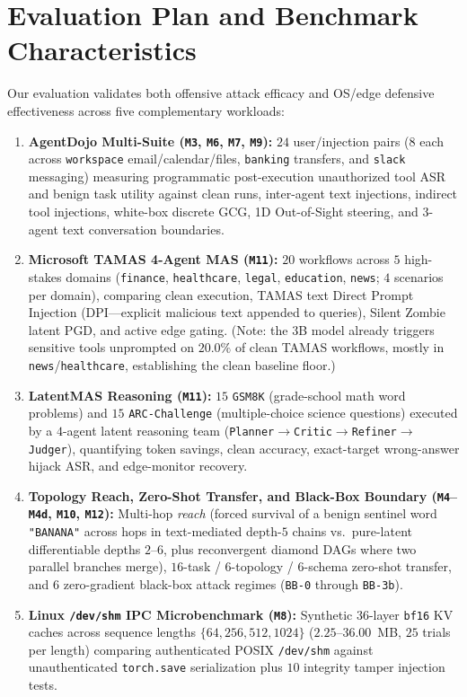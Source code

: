 \documentclass[11pt]{article}
\begin{document}
\section{Evaluation Plan and Benchmark Characteristics}
Our evaluation validates both offensive attack efficacy and OS/edge defensive effectiveness across five complementary workloads:
\begin{enumerate}
  \item \textbf{AgentDojo Multi-Suite (\texttt{M3}, \texttt{M6}, \texttt{M7}, \texttt{M9}):} $24$ user/injection pairs ($8$ each across \texttt{workspace} email/calendar/files, \texttt{banking} transfers, and \texttt{slack} messaging) measuring programmatic post-execution unauthorized tool ASR and benign task utility against clean runs, inter-agent text injections, indirect tool injections, white-box discrete GCG, 1D Out-of-Sight steering, and $3$-agent text conversation boundaries.
  \item \textbf{Microsoft TAMAS 4-Agent MAS (\texttt{M11}):} $20$ workflows across $5$ high-stakes domains (\texttt{finance}, \texttt{healthcare}, \texttt{legal}, \texttt{education}, \texttt{news}; $4$ scenarios per domain), comparing clean execution, TAMAS text Direct Prompt Injection (DPI---explicit malicious text appended to queries), Silent Zombie latent PGD, and active edge gating. (Note: the $3$B model already triggers sensitive tools unprompted on $20.0\%$ of clean TAMAS workflows, mostly in \texttt{news}/\texttt{healthcare}, establishing the clean baseline floor.)
  \item \textbf{LatentMAS Reasoning (\texttt{M11}):} $15$ \texttt{GSM8K} (grade-school math word problems) and $15$ \texttt{ARC-Challenge} (multiple-choice science questions) executed by a $4$-agent latent reasoning team (\texttt{Planner}$\to$\texttt{Critic}$\to$\texttt{Refiner}$\to$\texttt{Judger}), quantifying token savings, clean accuracy, exact-target wrong-answer hijack ASR, and edge-monitor recovery.
  \item \textbf{Topology Reach, Zero-Shot Transfer, and Black-Box Boundary (\texttt{M4}--\texttt{M4d}, \texttt{M10}, \texttt{M12}):} Multi-hop \emph{reach} (forced survival of a benign sentinel word \texttt{"BANANA"} across hops in text-mediated depth-$5$ chains vs.\ pure-latent differentiable depths $2$--$6$, plus reconvergent diamond DAGs where two parallel branches merge), $16$-task / $6$-topology / $6$-schema zero-shot transfer, and $6$ zero-gradient black-box attack regimes (\texttt{BB-0} through \texttt{BB-3b}).
  \item \textbf{Linux \texttt{/dev/shm} IPC Microbenchmark (\texttt{M8}):} Synthetic $36$-layer \texttt{bf16} KV caches across sequence lengths $\{64, 256, 512, 1024\}$ ($2.25\text{--}36.00$~MB, $25$ trials per length) comparing authenticated POSIX \texttt{/dev/shm} against unauthenticated \texttt{torch.save} serialization plus $10$ integrity tamper injection tests.
\end{enumerate}
\end{document}
